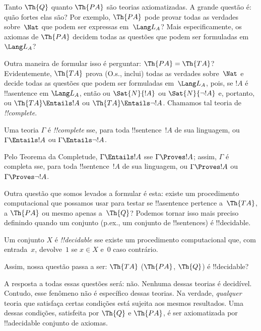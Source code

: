 \documentclass[../../../include/open-logic-section]{subfiles}
\begin{document}
Tanto $\Th{Q}$ quanto $\Th{PA}$ são teorias axiomatizadas. A grande
questão é: quão fortes elas são? Por exemplo, $\Th{PA}$ pode provar
todas as verdades sobre~$\Nat$ que podem ser expressas em~$\Lang L_A$?
Mais especificamente, os axiomas de $\Th{PA}$ decidem todas as questões
que podem ser formuladas em~$\Lang L_A$?

Outra maneira de formular isso é perguntar: $\Th{PA} = \Th{TA}$?
Evidentemente, $\Th{TA}$ prova (O.s.\@, inclui) todas as verdades
sobre~$\Nat$ e decide todas as questões que podem ser formuladas
em~$\Lang L_A$, pois, se $!A$ é !!a{sentence} em $\Lang L_A$, então ou
$\Sat{N}{!A}$ ou $\Sat{N}{\lnot !A}$ e, portanto, ou
$\Th{TA} \Entails !A$ ou $\Th{TA} \Entails \lnot !A$. Chamamos tal
teoria de \emph{!!{complete}}.

\begin{defn}
Uma teoria $\Gamma$ é \emph{!!{complete}} sse, para toda
!!{sentence}~$!A$ de sua linguagem, ou $\Gamma \Entails !A$ ou
$\Gamma \Entails \lnot !A$.
\end{defn}

\begin{explain}
Pelo Teorema da Completude, $\Gamma \Entails !A$ sse $\Gamma \Proves
!A$; assim, $\Gamma$ é completa sse, para toda !!{sentence}~$!A$ de
sua linguagem, ou $\Gamma \Proves !A$ ou $\Gamma \Proves \lnot !A$.
\end{explain}

Outra questão que somos levados a formular é esta: existe um
procedimento computacional que possamos usar para testar se
!!a{sentence} pertence a~$\Th{TA}$, a $\Th{PA}$ ou mesmo apenas
a~$\Th{Q}$? Podemos tornar isso mais preciso definindo quando um
conjunto (p.ex., um conjunto de !!{sentence}s) é !!{decidable}.

\begin{defn}
Um conjunto $X$ é \emph{!!{decidable}} sse existe um procedimento
computacional que, com entrada~$x$, devolve~$1$ se $x \in X$ e~$0$ caso
contrário.
\end{defn}

Assim, nossa questão passa a ser: $\Th{TA}$ ($\Th{PA}$, $\Th{Q}$) é
!!{decidable}?

A resposta a todas essas questões será: não. Nenhuma dessas teorias é
decidível. Contudo, esse fenômeno não é específico dessas teorias. Na
verdade, \emph{qualquer} teoria que satisfaça certas condições está
sujeita aos mesmos resultados. Uma dessas condições, satisfeita por
$\Th{Q}$ e $\Th{PA}$, é ser axiomatizada por !!a{decidable} conjunto
de axiomas.
\end{document}
